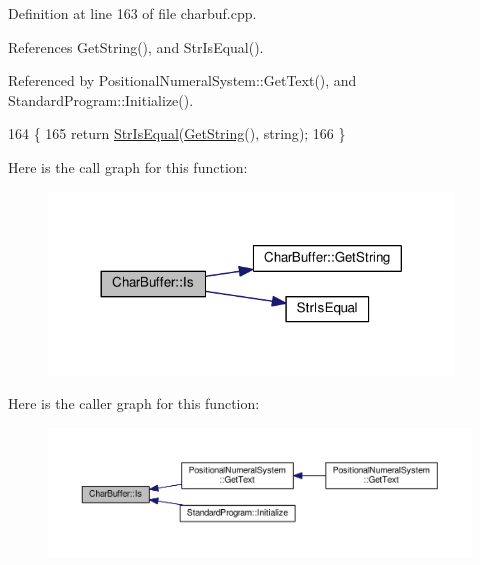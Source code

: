 Definition at line 163 of file charbuf.\+cpp.



References Get\+String(), and Str\+Is\+Equal().



Referenced by Positional\+Numeral\+System\+::\+Get\+Text(), and Standard\+Program\+::\+Initialize().


\begin{DoxyCode}
164 \{
165     \textcolor{keywordflow}{return} \hyperlink{clib_8h_a2a1f39d11cbbaac992d42e67557dac4b}{StrIsEqual}(\hyperlink{classCharBuffer_a7dfd3feaaf80f318ba44efe15b1ec44b}{GetString}(), \textcolor{keywordtype}{string});
166 \}
\end{DoxyCode}


Here is the call graph for this function\+:
\nopagebreak
\begin{figure}[H]
\begin{center}
\leavevmode
\includegraphics[width=305pt]{dc/d84/classCharBuffer_a64988275bda43dddb6d2b3b9551cefb0_cgraph}
\end{center}
\end{figure}




Here is the caller graph for this function\+:
\nopagebreak
\begin{figure}[H]
\begin{center}
\leavevmode
\includegraphics[width=350pt]{dc/d84/classCharBuffer_a64988275bda43dddb6d2b3b9551cefb0_icgraph}
\end{center}
\end{figure}


